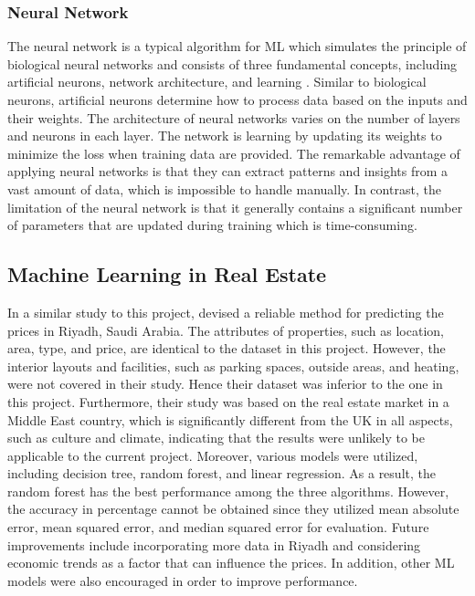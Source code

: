 \documentclass[12pt,twoside]{report}
\begin{document}
\subsubsection{Neural Network}
The neural network is a typical algorithm for ML which simulates the principle of biological neural networks and consists of three fundamental concepts, including artificial neurons, network architecture, and learning \citep{RN36}. Similar to biological neurons, artificial neurons determine how to process data based on the inputs and their weights. The architecture of neural networks varies on the number of layers and neurons in each layer. The network is learning by updating its weights to minimize the loss when training data are provided. The remarkable advantage of applying neural networks is that they can extract patterns and insights from a vast amount of data, which is impossible to handle manually. In contrast, the limitation of the neural network is that it generally contains a significant number of parameters that are updated during training which is time-consuming. 

\subsection{Machine Learning in Real Estate}
In a similar study to this project, \citet{RN17} devised a reliable method for predicting the prices in Riyadh, Saudi Arabia. The attributes of properties, such as location, area, type, and price, are identical to the dataset in this project. However, the interior layouts and facilities, such as parking spaces, outside areas, and heating, were not covered in their study. Hence their dataset was inferior to the one in this project. Furthermore, their study was based on the real estate market in a Middle East country, which is significantly different from the UK in all aspects, such as culture and climate, indicating that the results were unlikely to be applicable to the current project. Moreover, various models were utilized, including decision tree, random forest, and linear regression. As a result, the random forest has the best performance among the three algorithms. However, the accuracy in percentage cannot be obtained since they utilized mean absolute error, mean squared error, and median squared error for evaluation. Future improvements include incorporating more data in Riyadh and considering economic trends as a factor that can influence the prices. In addition, other ML models were also encouraged in order to improve performance. 
\\
\end{document}
